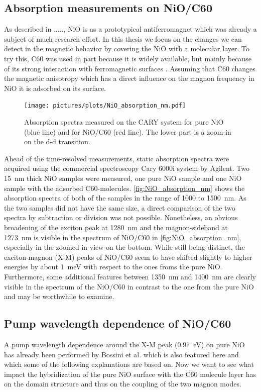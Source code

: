 \subsection{Absorption measurements on NiO/C60}
As described in ....., NiO is as a prototypical antiferromagnet which was already a subject of much research effort.
In this thesis we focus on the changes we can detect in the magnetic behavior by covering the NiO with a molecular layer.
To try this, C60 was used in part because it is widely available, but mainly because of its strong interaction with ferromagnetic surfaces .
Assuming that C60 changes the magnetic anisotropy which has a direct influence on the magnon frequency in NiO it is adsorbed on its surface.
\begin{figure}[ht]
    \centering
    \texttt{[image: pictures/plots/NiO\_absorption\_nm.pdf]}
    \caption{Absorption spectra measured on the CARY system for pure NiO (blue line) and for NiO/C60 (red line). The lower part is a zoom-in on the d-d transition.}
    \label{fig:NiO_absorption_nm}
\end{figure}
\FloatBarrier
Ahead of the time-resolved measurements, static absorption spectra were acquired using the commercial spectroscopy Cary 6000i system by Agilent.
Two \qty{15}{nm} thick NiO samples were measured, one pure NiO sample and one NiO sample with the adsorbed C60-molecules.
\autoref{fig:NiO_absorption_nm} shows the absorption spectra of both of the samples in the range of 1000 to \qty{1500}{nm}.
As the two samples did not have the same size, a direct comparison of the two spectra by subtraction or division was not possible.
Nonetheless, an obvious broadening of the exciton peak at \qty{1280}{nm} and the magnon-sideband at \qty{1273}{nm} is visible in the spectrum of NiO/C60 in \autoref{fig:NiO_absorption_nm}, especially in the zoomed-in view on the bottom.
While still being distinct, the exciton-magnon (X-M) peaks of NiO/C60 seem to have shifted slightly to higher energies by about \qty{1}{meV} with respect to the ones froms the pure NiO.
Furthermore, some additional features between \qty{1350}{nm} and \qty{1400}{nm} are clearly visible in the spectrum of the NiO/C60 in contrast to the one from the pure NiO and may be worthwhile to examine.

\subsection{Pump wavelength dependence of NiO/C60}
A pump wavelength dependence around the X-M peak (\qty{0.97}{eV}) on pure NiO has already been performed by Bossini et al.  which is also featured here and which some of the following explanations are based on.
Now we want to see what impact the hybridization of the pure NiO surface with the C60 molecule layer has on the domain structure and thus on the coupling of the two magnon modes.

